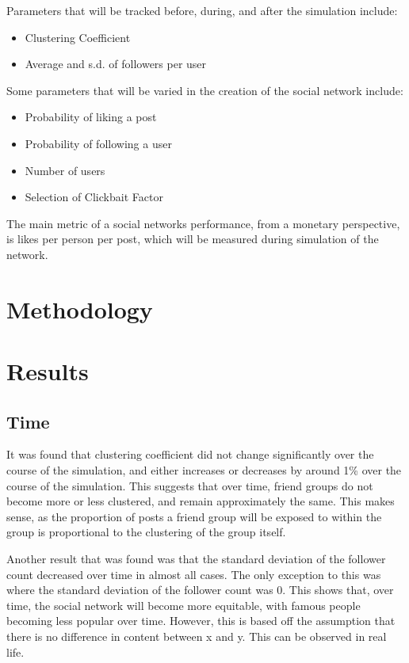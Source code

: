 \documentclass{article}
\begin{document}
Parameters that will be tracked before, during, and after the simulation include:
\begin{itemize}
    \item Clustering Coefficient
    \item Average and s.d. of followers per user
\end{itemize}

Some parameters that will be varied in the creation of the social network include:
\begin{itemize}
    \item Probability of liking a post
    \item Probability of following a user
    \item Number of users
    \item Selection of Clickbait Factor
\end{itemize}

The main metric of a social networks performance, from a monetary perspective,
is likes per person per post, which will be measured during simulation of the network.
\section{Methodology}

\section{Results}

\subsection{Time}
It was found that clustering coefficient did not change significantly over the
course of the simulation, and either increases or decreases by around 1\% over the course of the simulation.
This suggests that over time, friend groups do not become more or less clustered, and remain approximately the same.
This makes sense, as the proportion of posts a friend group will be exposed to within the group
is proportional to the clustering of the group itself.

Another result that was found was that the standard deviation of the follower count
decreased over time in almost all cases. The only exception to this was where the
standard deviation of the follower count was 0. This shows that, over time, the
social network will become more equitable, with famous people becoming less popular
over time. However, this is based off the assumption that there is no difference
in content between x and y. This can be observed in real life.
\end{document}
